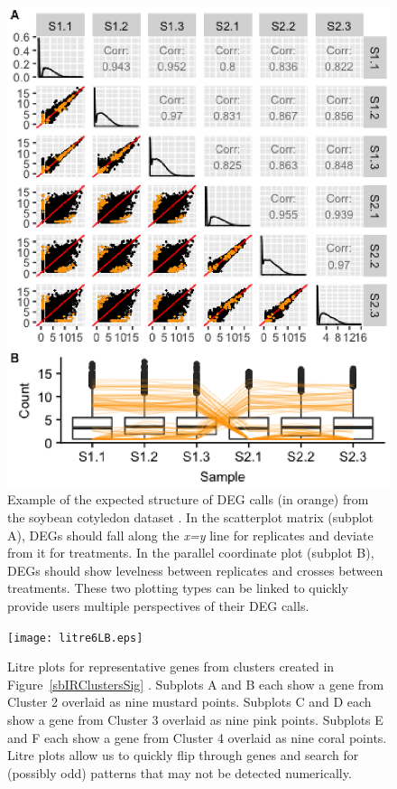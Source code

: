 \documentclass{bioinfo}
\begin{document}
\begin{figure}
\includegraphics[width=\linewidth]{sbIRDEG.eps}
\caption{Example of the expected structure of DEG calls (in orange) from the soybean cotyledon dataset \cite{Brown}. In the scatterplot matrix (subplot A), DEGs should fall along the \textit{x=y} line for replicates and deviate from it for treatments. In the parallel coordinate plot (subplot B), DEGs should show levelness between replicates and crosses between treatments. These two plotting types can be linked to quickly provide users multiple perspectives of their DEG calls.
\label{sbIRDEG}}
\end{figure}

\begin{figure}
\texttt{[image: litre6LB.eps]}
\caption{Litre plots for representative genes from clusters created in Figure~\ref{sbIRClustersSig} \citep{Lauter16}. Subplots A and B each show a gene from Cluster 2 overlaid as nine mustard points. Subplots C and D each show a gene from Cluster 3 overlaid as nine pink points. Subplots E and F each show a gene from Cluster 4 overlaid as nine coral points. Litre plots allow us to quickly flip through genes and search for (possibly odd) patterns that may not be detected numerically.
\label{repDot}}
\end{figure}
\end{document}
